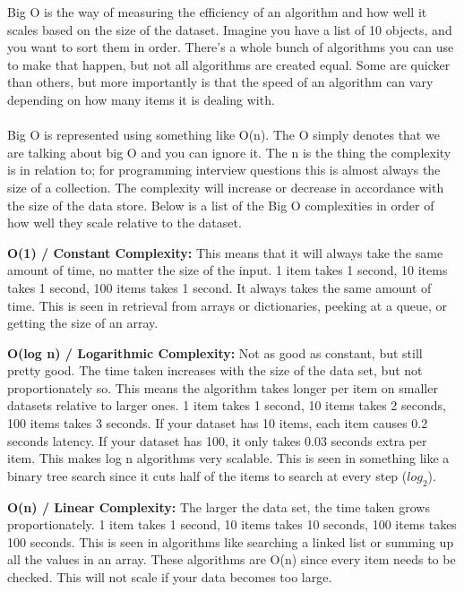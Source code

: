 \documentclass[9pt]{extarticle} %
\begin{document}
%
%
\begin{minipage}[t]{.64\linewidth} %
\vspace{-0.4cm}
\hypertarget{firstnews}{}

Big O is the way of measuring the efficiency of an algorithm and how well it 
scales based on the size of the dataset. Imagine you have a list of 10 objects,
and you want to sort them in order. There’s a whole bunch of algorithms you can 
use to make that happen, but not all algorithms are created equal. Some are 
quicker than others, but more importantly is that the speed of an algorithm can
vary depending on how many items it is dealing with. \\
\\
Big O is represented using something like O(n). The O simply denotes that we are 
talking about big O and you can ignore it. The n is the thing the complexity is
in relation to; for programming interview questions this is almost always the 
size of a collection. The complexity will increase or decrease in accordance 
with the size of the data store. Below is a list of the Big O complexities 
in order of how well they scale relative to the dataset.

\textbf{O(1) / Constant Complexity:} 
This means that it will always take the same amount of time, no matter the size
of the input. 1 item takes 1 second, 10 items takes 1 second, 100 items 
takes 1 second. It always takes the same amount of time. This is seen in 
retrieval from arrays or dictionaries, peeking at a queue, or getting the size 
of an array.

\textbf{O(log n) / Logarithmic Complexity:}
Not as good as constant, but still pretty good. The time taken increases with 
the size of the data set, but not proportionately so. This means the algorithm
takes longer per item on smaller datasets relative to larger ones. 1 item 
takes 1 second, 10 items takes 2 seconds, 100 items takes 3 seconds. If your
dataset has 10 items, each item causes 0.2 seconds latency. If your dataset has
100, it only takes 0.03 seconds extra per item. This makes log n algorithms 
very scalable. This is seen in something like a binary tree search since it cuts
half of the items to search at every step ($log_2$).

\textbf{O(n) / Linear Complexity:}
The larger the data set, the time taken grows proportionately. 1 item takes 1
second, 10 items takes 10 seconds, 100 items takes 100 seconds. This is seen
in algorithms like searching a linked list or summing up all the values in an 
array. These algorithms are O(n) since every item needs to be checked. 
This will not scale if your data becomes too large.


\end{minipage}
\end{document}
